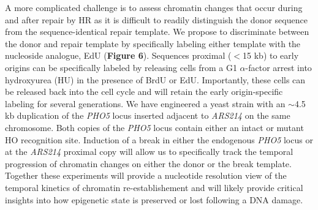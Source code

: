 A more complicated challenge is to assess chromatin changes that occur during and after repair by HR as %
it is difficult to readily distinguish the donor sequence from the sequence-identical repair template. 
We propose to discriminate between the donor and repair template by specifically labeling either template with the nucleoside analogue, EdU ({\color{dukeblue}\textbf{Figure 6}}). Sequences proximal ($<$15 kb) to early origins can be specifically labeled %
by releasing cells from a G1 $\alpha$-factor arrest into hydroxyurea (HU) in the presence of BrdU or EdU\citep{Peace2016-rb,Belsky2015-li}.  Importantly, these cells can be released back into the cell cycle and will retain the early origin-specific labeling for several generations. %
We have engineered a yeast strain with an $\sim$4.5 kb duplication of the  \textit{PHO5} locus inserted adjacent to  \textit{ARS214} on the same chromosome.  Both copies of the \textit{PHO5} locus contain either an intact or mutant HO recognition site. Induction of a break in either the endogenous \textit{PHO5} locus or at the \textit{ARS214} proximal copy will allow us to specifically track the temporal progression of chromatin changes on either the donor or the break template.  Together these experiments will provide a nucleotide resolution view of the temporal kinetics of chromatin re-establishement and will likely provide critical insights into how epigenetic state is preserved or lost following a DNA damage.



